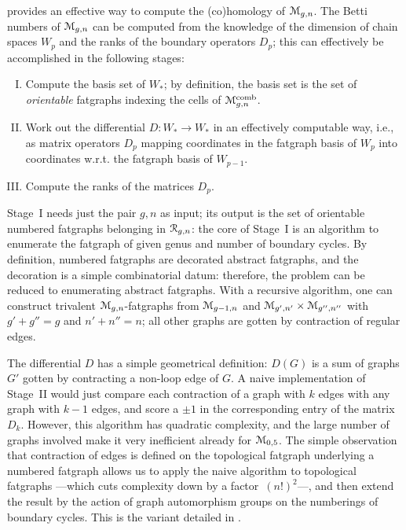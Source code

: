  provides an effective way to compute the
(co)homology of $\mathcal{M}_{g,n}$.  The Betti numbers of $\mathcal{M}_{g,n}$ can be
computed from the knowledge of the dimension of chain spaces $W_p$ and
the ranks of the boundary operators $D_p$; this can effectively be
accomplished in the following stages:
\begin{enumerate}[I.]
\item Compute the basis set of $W_*$; by definition, the basis set is
  the set of \emph{orientable} fatgraphs indexing
  the cells of $\mathcal{M}\sp{\text{comb}}_{g,n}$.
\item Work out the differential $D: W_* \to W_*$ in an
  effectively computable way, i.e., as matrix operators $D_p$ mapping
  coordinates in the fatgraph basis of $W_p$ into coordinates
  w.r.t. the fatgraph basis of $W_{p-1}$.
\item Compute the ranks of the matrices $D_p$.
\end{enumerate}

Stage~I needs just the pair $g,n$ as input; its output is the set of
orientable numbered fatgraphs belonging in $\mathcal{R}_{g,n}$: the core of
Stage~I is an algorithm to enumerate the fatgraph of given genus and
number of boundary cycles. By definition, numbered fatgraphs are
decorated abstract fatgraphs, and the decoration is a simple
combinatorial datum: therefore, the problem can be reduced to
enumerating abstract fatgraphs.  With a recursive algorithm, one can
construct trivalent $\mathcal{M}_{g,n}$-fatgraphs from $\mathcal{M}_{g-1,n}$ and
$\mathcal{M}_{g',n'} \times \mathcal{M}_{g'',n''}$ with $g'+g''=g$ and $n'+n''=n$; all
other graphs are gotten by contraction of regular edges.

The differential $D$ has a simple geometrical definition: $D(G)$ is a
sum of graphs $G'$ gotten by contracting a non-loop edge of $G$. A
naive implementation of Stage~II would just compare each contraction
of a graph with $k$ edges with any graph with $k-1$ edges, and score a
$\pm 1$ in the corresponding entry of the matrix $D_k$.  However, this
algorithm has quadratic complexity, and the large number of graphs
involved make it very inefficient already for $\mathcal{M}_{0,5}$.  The simple
observation that contraction of edges is defined on the topological
fatgraph underlying a numbered fatgraph allows us to apply the naive
algorithm to topological fatgraphs ---which cuts complexity down by a
factor~$(n!)^2$---, and then extend the result by the action of graph
automorphism groups on the numberings of boundary cycles.  This
is the variant detailed in .

